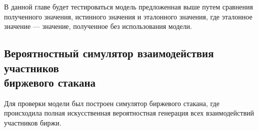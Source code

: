 \documentclass[12pt, a4paper]{article}
\begin{document}
В данной главе будет тестироваться модель предложенная выше путем сравнения полученного значения, истинного значения и эталонного значения, где эталонное значение --- значение, полученное без использования модели.

\subsection{Вероятностный симулятор взаимодействия участников \\ биржевого стакана}

Для проверки модели был построен симулятор биржевого стакана, где происходила полная искусственная вероятностная генерация всех взаимодействий участников биржи.


\begin{comment}
\section{Вероятностный симулятор взаимодействия \\ участников биржевого стакана}
\section{Практические результаты}

\hypertarget{qrm}
\hypertarget{binance_api}
\hypertarget{hotteling}
\end{comment}
\end{document}
